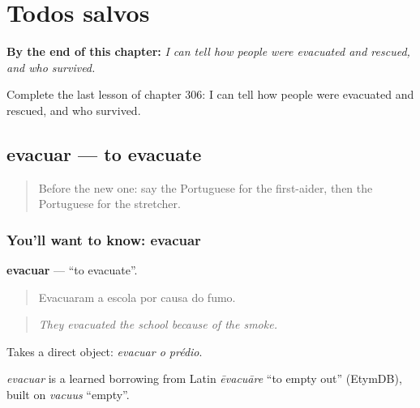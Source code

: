 
\chapter{Todos salvos}
\label{ch:pt-todos-salvos}

\begin{chapteropening}
\textbf{By the end of this chapter:} \emph{I can tell how people were evacuated and rescued, and who survived.}

Complete the last lesson of chapter 306: I can tell how people were evacuated and rescued, and who survived.
\end{chapteropening}

\section[evacuar]{evacuar — to evacuate}

\label{lesson:PT-C306-evacuar}



\begin{quote}
Before the new one: say the Portuguese for the first-aider, then the Portuguese for the stretcher.
\end{quote}

\subsection*{You'll want to know: evacuar}
\textbf{evacuar} — \textquotedblleft{}to evacuate\textquotedblright{}.

\begin{quote}
Evacuaram a escola por causa do fumo.
\end{quote}

\begin{quote}
\emph{They evacuated the school because of the smoke.}
\end{quote}

Takes a direct object: \emph{evacuar o prédio}.

\begin{cousinweb}
\emph{evacuar} is a learned borrowing from Latin \emph{ēvacuāre} \textquotedblleft{}to empty out\textquotedblright{} (EtymDB), built on \emph{vacuus} \textquotedblleft{}empty\textquotedblright{}.
\end{cousinweb}

